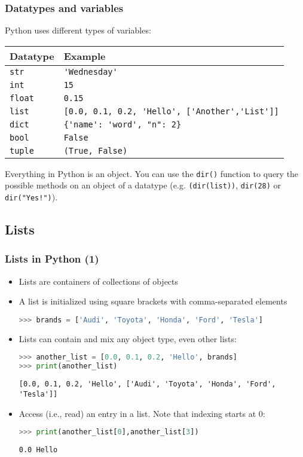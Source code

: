 \begin{frame}[fragile]
  \frametitle{Datatypes and variables}
  Python uses different types of variables:
      \begin{longtable}{l!{\vrule}l}
       Datatype        & Example \\ \hline
       \lstinline$str$    & \lstinline$'Wednesday'$ \\
       \lstinline$int$    & \lstinline$15$ \\
       \lstinline$float$  & \lstinline$0.15$ \\
       \lstinline$list$   & \lstinline$[0.0, 0.1, 0.2, 'Hello', ['Another','List']]$ \\
       \lstinline$dict$   & \lstinline${'name': 'word', "n": 2}$ \\
       \lstinline$bool$   & \lstinline$False$ \\
       \lstinline$tuple$  & \lstinline$(True, False)$ \\
     \end{longtable}
     \pause
     Everything in Python is an object. You can use the \lstinline$dir()$ function to query the possible methods on an object of a datatype (e.g. \lstinline$(dir(list))$, \lstinline$dir(28)$ or \lstinline$dir("Yes!")$).
 \end{frame}

\subsection{Lists}
\begin{frame}[fragile]
  \frametitle{Lists in Python (1)}
  \begin{itemize}
    \item Lists are containers of collections of objects
    \item A list is initialized using square brackets with comma-separated elements
    \begin{lstlisting}[language=Python,numbers=none]
>>> brands = ['Audi', 'Toyota', 'Honda', 'Ford', 'Tesla']
    \end{lstlisting}
    \item Lists can contain and mix any object type, even other lists:
    \begin{lstlisting}[language=Python,numbers=none]
>>> another_list = [0.0, 0.1, 0.2, 'Hello', brands]
>>> print(another_list)
    \end{lstlisting}
    \begin{lstlisting}[style=PyOutput]
[0.0, 0.1, 0.2, 'Hello', ['Audi', 'Toyota', 'Honda', 'Ford', 'Tesla']]
    \end{lstlisting}
    \item Access (i.e., read) an entry in a list. Note that indexing starts at 0:
    \begin{lstlisting}[language=Python,numbers=none]
>>> print(another_list[0],another_list[3])
    \end{lstlisting}
    \begin{lstlisting}[style=PyOutput]
0.0 Hello
    \end{lstlisting}
  \end{itemize}
 \end{frame}
 
